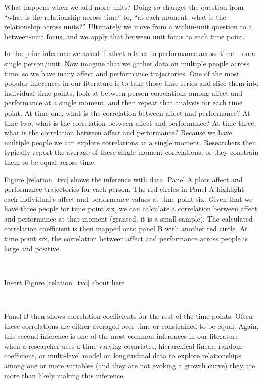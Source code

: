 \documentclass[english,,man]{apa6}
\theoremstyle{definition}
\theoremstyle{definition}
\theoremstyle{definition}
\theoremstyle{remark}
\begin{document}
What happens when we add more units? Doing so changes the question from
\enquote{what is the relationship across time} to, \enquote{at each
moment, what is the relationship across units?} Ultimately we move from
a within-unit question to a between-unit focus, and we apply that
between unit focus to each time point.

In the prior inference we asked if affect relates to performance across
time -- on a single person/unit. Now imagine that we gather data on
multiple people across time, so we have many affect and performance
trajectories. One of the most popular inferences in our literature is to
take those time series and slice them into individual time points, look
at between-person correlations among affect and performance at a single
moment, and then repeat that analysis for each time point. At time one,
what is the correlation between affect and performance? At time two,
what is the correlation between affect and performance? At time three,
what is the correlation between affect and performance? Because we have
multiple people we can explore correlations at a single moment.
Researchers then typically report the average of these single moment
correlations, or they constrain them to be equal across time.

Figure \ref{relation_tvc} shows the inference with data. Panel A plots
affect and performance trajectories for each person. The red circles in
Panel A highlight each individual's affect and performance values at
time point six. Given that we have three people for time point six, we
can calculate a correlation between affect and performance at that
moment (granted, it is a small sample). The calculated correlation
coefficient is then mapped onto panel B with another red circle. At time
point six, the correlation between affect and performance across people
is large and positive.

\begin{center}

------------

Insert Figure \ref{relation_tvc} about here

------------

\end{center}

Panel B then shows correlation coefficients for the rest of the time
points. Often these correlations are either averaged over time or
constrained to be equal. Again, this second inference is one of the most
common inferences in our literature -- when a researcher uses a
time-varying covariates, hierarchical linear, random-coefficient, or
multi-level model on longitudinal data to explore relationships among
one or more variables (and they are not evoking a growth curve) they are
more than likely making this inference.
\end{document}
